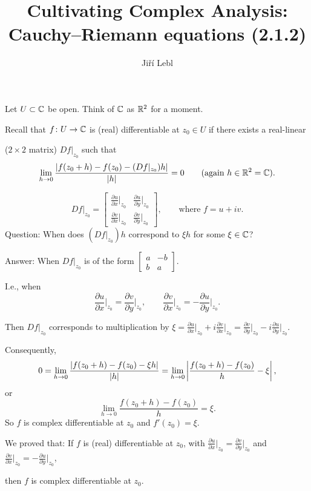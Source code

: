 \documentclass[10pt,aspectratio=169]{beamer}
\author{Ji\v{r}\'i Lebl}
\institute[OSU]{%
Departemento pri Matematiko de Oklahoma {\^S}tata Universitato}
\title{Cultivating Complex Analysis:\\%
Cauchy--Riemann equations (2.1.2)}
\date{}
\begin{document}
\begin{frame}
\titlepage
\end{frame}

\begin{frame}
Let $U \subset {\mathbb{C}}$ be open.  Think of ${\mathbb{C}}$ as ${\mathbb{R}}^2$ for a moment.

\pause
\medskip

Recall that $f \colon U \to {\mathbb{C}}$ is (real) differentiable at $z_0 \in U$ if
there exists a real-linear

($2\times 2$ matrix) $Df|_{z_0}$ such that
\[
\lim_{h \to 0} \frac{\lvert {f(z_0+h) - f(z_0) - (Df|_{z_0}) h} \rvert}{\lvert {h} \rvert} = 0 
\qquad \text{(again $h\in {\mathbb{R}}^2={\mathbb{C}}$).}
\]

\pause

\[
Df|_{z_0} =
\begin{bmatrix}
\frac{\partial u}{\partial x}\big|_{z_0} & \frac{\partial u}{\partial
y}\big|_{z_0} \\[5pt]
\frac{\partial v}{\partial x}\big|_{z_0} & \frac{\partial v}{\partial y}\big|_{z_0}
\end{bmatrix} ,
\qquad \text{where }
f= u + iv. 
\]
\pause
Question: When does $(Df|_{z_0})h$ correspond to $\xi h$ for some $\xi \in {\mathbb{C}}$?

\medskip
\pause

Answer: When $Df|_{z_0}$ is of the form
$\left[ \begin{smallmatrix}
a & -b \\ b & a
\end{smallmatrix} \right]$.

\medskip
\pause

I.e., when
\[
\frac{\partial u}{\partial x}\Big|_{z_0} =
\frac{\partial v}{\partial y}\Big|_{z_0}
, \qquad
\frac{\partial v}{\partial x}\Big|_{z_0} =
-\frac{\partial u}{\partial y}\Big|_{z_0} .
\]

\pause
Then
$Df|_{z_0}$ corresponds to multiplication by 
$\xi = \frac{\partial u}{\partial x}\big|_{z_0} + i \frac{\partial v}{\partial
x}\big|_{z_0} = \frac{\partial v}{\partial y}\big|_{z_0} - i \frac{\partial u}{\partial
y}\big|_{z_0}$.

\end{frame}

\begin{frame}
Consequently,
\begin{equation*}
0 = \lim_{h \to 0} \frac{\lvert {f(z_0+h) - f(z_0) - \xi h} \rvert}{\lvert {h} \rvert} =
\lim_{h \to 0} \left\lvert {\frac{f(z_0+h) - f(z_0)}{h} - \xi} \right\rvert ,
\end{equation*}
\pause
or
\begin{equation*}
\lim_{h \to 0} \frac{f(z_0+h) - f(z_0)}{h} = \xi .
\end{equation*}
\pause
So $f$ is complex differentiable at $z_0$ and $f'(z_0) = \xi$.

\medskip
\pause

We proved that: If $f$ is (real) differentiable at $z_0$, with
$\frac{\partial u}{\partial x}\big|_{z_0} = \frac{\partial v}{\partial
y}\big|_{z_0}$ and $\frac{\partial v}{\partial x}\big|_{z_0} = -\frac{\partial
u}{\partial y}\big|_{z_0}$,

then $f$ is complex differentiable at $z_0$.

\end{frame}
\end{document}
